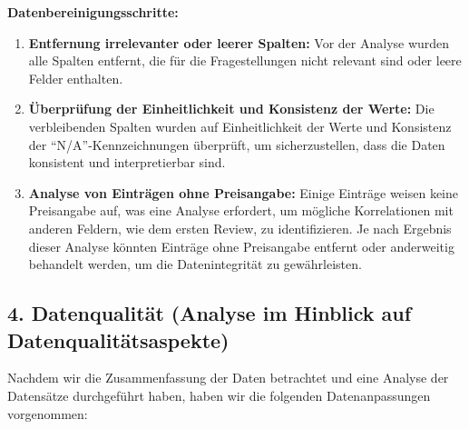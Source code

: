 \documentclass[
  journal,
]{IEEEtran}%
\begin{document}
\textbf{Datenbereinigungsschritte:}

\begin{enumerate}
\def\labelenumi{\arabic{enumi}.}
\item
  \textbf{Entfernung irrelevanter oder leerer Spalten:} Vor der Analyse
  wurden alle Spalten entfernt, die für die Fragestellungen nicht
  relevant sind oder leere Felder enthalten.
\item
  \textbf{Überprüfung der Einheitlichkeit und Konsistenz der Werte:} Die
  verbleibenden Spalten wurden auf Einheitlichkeit der Werte und
  Konsistenz der ``N/A''-Kennzeichnungen überprüft, um sicherzustellen,
  dass die Daten konsistent und interpretierbar sind.
\item
  \textbf{Analyse von Einträgen ohne Preisangabe:} Einige Einträge
  weisen keine Preisangabe auf, was eine Analyse erfordert, um mögliche
  Korrelationen mit anderen Feldern, wie dem ersten Review, zu
  identifizieren. Je nach Ergebnis dieser Analyse könnten Einträge ohne
  Preisangabe entfernt oder anderweitig behandelt werden, um die
  Datenintegrität zu gewährleisten.
\end{enumerate}

\hypertarget{datenqualituxe4t-analyse-im-hinblick-auf-datenqualituxe4tsaspekte}{%
\subsection{4. Datenqualität (Analyse im Hinblick auf
Datenqualitätsaspekte)}\label{datenqualituxe4t-analyse-im-hinblick-auf-datenqualituxe4tsaspekte}}

Nachdem wir die Zusammenfassung der Daten betrachtet und eine Analyse
der Datensätze durchgeführt haben, haben wir die folgenden
Datenanpassungen vorgenommen:
\end{document}

